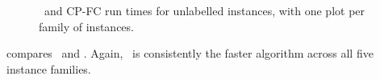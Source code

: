 \begin{figure}[htb]
{        \label{figure:mcsplain-runtime-mcsplitdown-cpfc-bv}
    }
    \caption{\McSplitDown\ and CP-FC run times for unlabelled instances, with one plot per family of instances.}
    \label{figure:mcsplain-runtime-mcsplitdown-cpfc-scatters}
\end{figure}

\FloatBarrier





 compares \kDown\ and \McSplitDown.
Again, \McSplitDown\ is consistently the faster algorithm across all five instance families.

